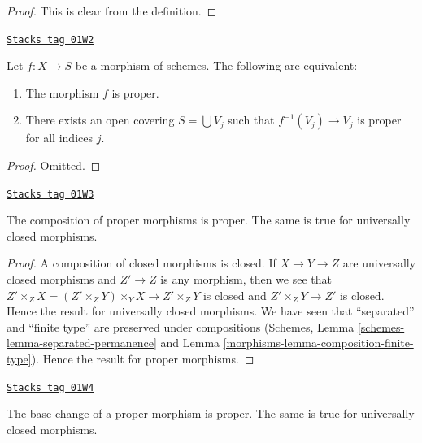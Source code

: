 \begin{proof}
This is clear from the definition.
\end{proof}

\begin{lemma}
\label{morphisms-lemma-proper-local-on-the-base}
\href{https://stacks.math.columbia.edu/tag/01W2}{\texttt{Stacks tag 01W2}}

Let $f : X \to S$ be a morphism of schemes.
The following are equivalent:
\begin{enumerate}
\item The morphism $f$ is proper.
\item There exists an open covering $S = \bigcup V_j$ such
that $f^{-1}(V_j) \to V_j$ is proper for all indices $j$.
\end{enumerate}
\end{lemma}

\begin{proof}
Omitted.
\end{proof}

\begin{lemma}
\label{morphisms-lemma-composition-proper}
\href{https://stacks.math.columbia.edu/tag/01W3}{\texttt{Stacks tag 01W3}}

The composition of proper morphisms is proper.
The same is true for universally closed morphisms.
\end{lemma}

\begin{proof}

A composition of closed morphisms is closed.
If $X \to Y \to Z$ are universally closed morphisms
and $Z' \to Z$ is any morphism, then we see that
$Z' \times_Z X = (Z' \times_Z Y) \times_Y X  \to Z' \times_Z Y$
is closed and $Z' \times_Z Y \to Z'$ is closed.
Hence the result for universally closed morphisms.
We have seen that ``separated'' and ``finite type''
are preserved under compositions
(Schemes, Lemma \ref{schemes-lemma-separated-permanence} and
Lemma \ref{morphisms-lemma-composition-finite-type}). Hence the
result for proper morphisms.
\end{proof}

\begin{lemma}
\label{morphisms-lemma-base-change-proper}
\href{https://stacks.math.columbia.edu/tag/01W4}{\texttt{Stacks tag 01W4}}

The base change of a proper morphism is proper.
The same is true for universally closed morphisms.
\end{lemma}

